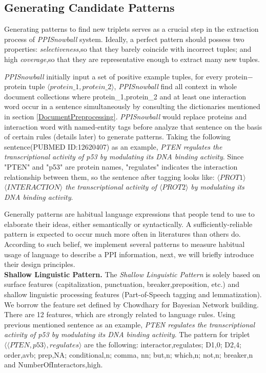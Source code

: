 \subsection{Generating Candidate Patterns}
\label{GenPatterns}

Generating patterns to find new triplets serves as a crucial step in the extraction process of \emph{PPISnowball} system. Ideally, a perfect pattern should possess two properties: \emph{selectiveness},so that they barely coincide with incorrect tuples; and high \emph{coverage},so that they are representative enough to extract many new tuples\cite{Agichtein.Gravano:2000}.

\emph{PPISnowball} initially input a set of positive example tuples, for every protein$-$protein tuple $\langle protein\_1,protein\_2\rangle$, \emph{PPISnowball} find all context in whole document collections where protein\_1,protein\_2 and at least one interaction word occur in a sentence simultaneously by consulting the dictionaries mentioned in section \ref{DocumentPreprocessing}. \emph{PPISnowball} would replace proteins and interaction word with named-entity tags before analyze that sentence on the basis of certain rules (details later) to generate patterns. Taking the following sentence(PUBMED ID:12620407) as an example, \emph{PTEN regulates the transcriptional activity of p53 by modulating its DNA binding activity}. Since "PTEN" and "p53" are protein names, "regulates" indicates the interaction relationship between them, so the sentence after tagging looks like: \emph{$\langle PROT1\rangle$ $\langle INTERACTION\rangle$ the transcriptional activity of $\langle PROT2\rangle$ by modulating its DNA binding activity}.

Generally patterns are habitual language expressions that people tend to use to elaborate their ideas, either semantically or syntactically. A sufficiently-reliable pattern is expected to occur much more often in literatures than others do. According to such belief, we implement several patterns to measure habitual usage of language to describe a PPI information, next, we will briefly introduce their design principles.\\

\textbf{Shallow Linguistic Pattern. }  The \emph{Shallow Linguistic Pattern} is solely based on surface features (capitalization, punctuation, breaker,preposition, etc.) and shallow linguistic processing features (Part-of-Speech tagging and lemmatization). We borrow the feature set defined by Chowdhary for Bayesian Network building\cite{DBLP:journals/bioinformatics/ChowdharyZL09}. There are 12 features, which are strongly related to language rules. Using previous mentioned sentence as an example, \emph{PTEN regulates the transcriptional activity of p53 by modulating its DNA binding activity}. The pattern for triplet $\langle\langle PTEN,p53\rangle,regulates\rangle$ are the following: interactor,regulates; D1,0; D2,4; order,avb; prep,NA; conditional,n; comma, nn; but,n; which,n; not,n; breaker,n and NumberOfInteractors,high.

